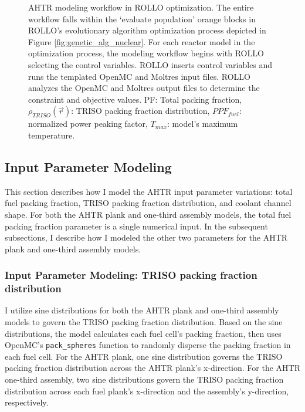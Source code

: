 \begin{figure}[htbp]
    \caption{\acrfull{AHTR} modeling workflow in \acrfull{ROLLO} optimization. The entire 
    workflow falls within the `evaluate population' orange blocks in ROLLO's evolutionary 
    algorithm optimization process depicted in Figure \ref{fig:genetic_alg_nuclear}. 
    For each reactor model in the optimization process, the modeling workflow begins 
    with ROLLO selecting the control variables. 
    ROLLO inserts control variables and runs the templated OpenMC and Moltres 
    input files. 
    ROLLO analyzes the OpenMC and Moltres output files to determine the constraint and 
    objective values.
    PF: Total packing fraction, $\rho_{TRISO}(\vec{r})$: TRISO packing fraction 
    distribution, $PPF_{fuel}$: normalized power peaking factor, $T_{max}$: model's maximum 
    temperature.} 
    \label{fig:ahtr-model-flow}
\end{figure}

\subsection{Input Parameter Modeling}
\label{sec:input-parameter-modeling}
This section describes how I model the \gls{AHTR} input parameter variations: 
total fuel packing fraction, \gls{TRISO} packing fraction distribution, 
and coolant channel shape. 
For both the \gls{AHTR} plank and one-third assembly models, the total fuel packing 
fraction parameter is a single numerical input.
In the subsequent subsections, I describe how I modeled the other two parameters for 
the \gls{AHTR} plank and one-third assembly models. 

\subsubsection{Input Parameter Modeling: TRISO packing fraction distribution}
I utilize sine distributions for both the \gls{AHTR} plank and one-third assembly 
models to govern the \gls{TRISO} packing fraction distribution.
Based on the sine distributions, the model calculates each fuel cell's packing 
fraction, then uses OpenMC's \texttt{pack\_spheres} function to randomly disperse 
the packing fraction in each fuel cell. 
For the \gls{AHTR} plank, one sine distribution governs the \gls{TRISO} packing 
fraction distribution across the \gls{AHTR} plank's x-direction. 
For the \gls{AHTR} one-third assembly, two sine distributions govern the \gls{TRISO} 
packing fraction distribution across each fuel plank's x-direction and the 
assembly's y-direction, respectively. 

